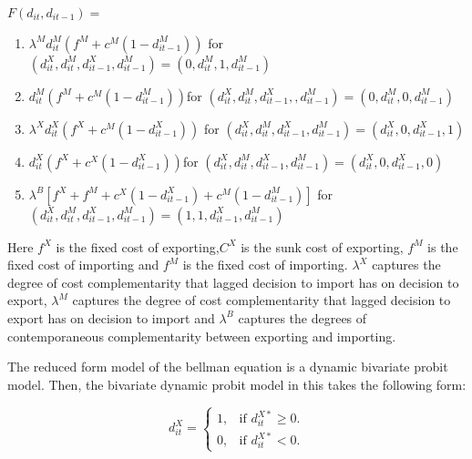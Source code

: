 \documentclass[12pt]{article}
\begin{document}
$F(d_{it}, d_{it-1})= $
\begin{enumerate}
\item $\lambda^{M}  d_{it}^{M}( f^{M} +c^{M}(1-d_{it-1}^{M}))$ \hfill for
  $(d_{it}^X, d_{it}^M,d_{it-1}^{X},d_{it-1}^M)= (0,d_{it}^M,1,d_{it-1}^M)$
\item $d_{it}^{M}( f^{M} +c^{M}(1-d_{it-1}^{M}))$\hfill for
  $(d_{it}^X, d_{it}^M,d_{it-1}^{X},,d_{it-1}^M)= (0,d_{it}^M,0,d_{it-1}^M)$
\item $\lambda^{X}  d_{it}^{X}( f^{X} +c^{M}(1-d_{it-1}^{X}))$ \hfill for
  $(d_{it}^X, d_{it}^M,d_{it-1}^X,d_{it-1}^{M})= (d_{it}^X,0,d_{it-1}^X,1)$
\item $d_{it}^{X}( f^{X} +c^{X}(1-d_{it-1}^{X}))$\hfill for
  $(d_{it}^X, d_{it}^M,d_{it-1}^X,d_{it-1}^{M})= (d_{it}^X,0,d_{it-1}^X,0)$
\item   $\lambda^{B}[f^{X} + f^{M} + c^{X}(1 - d_{it-1}^X) + c^{M}(1 -
  d_{it-1}^M)]$   for $ (d_{it}^X, d_{it}^M,d_{it-1}^X,d_{it-1}^{M}) =
  (1,1, d_{it-1}^X,d_{it-1}^M) $
\end{enumerate}
Here $f^{X}$ is the fixed cost of exporting,$C^{X}$ is the sunk cost
of exporting, $f^{M}$ is the fixed cost of importing and $f^{M}$ is the
fixed cost of importing. $\lambda^{X}$ captures the degree of cost 
complementarity that lagged decision to  import has on decision to
export, $\lambda^{M}$ captures the degree of cost 
complementarity that lagged decision to export has on decision to
import and  $\lambda^B$ captures the degrees of
contemporaneous complementarity between exporting and importing. 

The reduced form model of the bellman equation is a dynamic bivariate
probit model.  Then, the bivariate dynamic probit model in this takes the following form:

\begin{equation}
  d_{it}^{X}=\begin{cases}
   1 , & \text{if $d_{it}^{X*}\geq 0$}.\\
   0 , & \text{if $d_{it}^{X*}<  0$}.
  \end{cases}
\end{equation}
\end{document}
